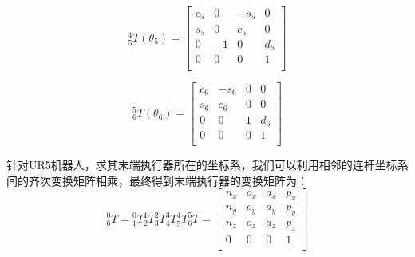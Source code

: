 \documentclass{seuthesis-2022}
\numberwithin{equation}{section}
\begin{document}
\begin{equation}
  ^4_5T(\theta_5)=
  \begin{bmatrix}
    c_5 & 0 & -s_5 & 0\\
    s_5 & 0 & c_5 & 0\\
    0 & -1 & 0 & d_5\\
    0 & 0 & 0 & 1\\
  \end{bmatrix}
  \label{eq:^4_5T}
\end{equation}

\begin{equation}
  ^5_6T(\theta_6)=
  \begin{bmatrix}
    c_6 & -s_6 & 0 & 0\\
    s_6 & c_6 & 0 & 0\\
    0 & 0 & 1 & d_6\\
    0 & 0 & 0 & 1\\
  \end{bmatrix}
  \label{eq:^5_6T}
\end{equation}

针对UR5机器人，求其末端执行器所在的坐标系，我们可以利用相邻的连杆坐标系间的齐次变换矩阵相乘，最终得到末端执行器的变换矩阵为：
\begin{equation}
  ^0_6T={^0_1T}{^1_2T}{^2_3T}{^3_4T}{^4_5T}{^5_6T}=
  \begin{bmatrix}
    n_x & o_x & a_x & p_x\\
    n_y & o_y & a_y & p_y\\
    n_z & o_z & a_z & p_z\\
    0 & 0 & 0 & 1\\
  \end{bmatrix}
  \label{eq:^0_6T}
\end{equation}
\end{document}
